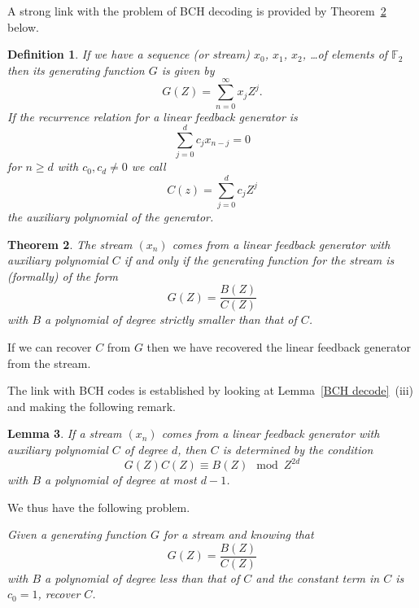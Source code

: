 \documentclass[12pt,a4paper]{article}
\theoremstyle{plain}
\newtheorem{theorem}{Theorem}[section]
\newtheorem{lemma}[theorem]{Lemma}
\newtheorem{definition}[theorem]{Definition}
\theoremstyle{definition}
\begin{document}
    A strong link with the problem of BCH decoding
    is provided by Theorem~\ref{quotient} below.
    \begin{definition}
        If we have a sequence (or stream) $x_{0}$, $x_{1}$,
        $x_{2}$, \dots of elements of ${\mathbb F}_{2}$ then
        its \emph{generating function} $G$ is given by
        \[G(Z)=\sum_{n=0}^{\infty}x_{j}Z^{j}.\]
        If the recurrence relation for
        a linear feedback generator is
        \[\sum_{j=0}^{d}c_{j}x_{n-j}=0\]
        for $n\geq d$ with $c_{0},c_{d}\neq 0$
        we call
        \[C(z)=\sum_{j=0}^{d}c_{j}Z^{j}\]
        the auxiliary polynomial of the generator.
    \end{definition}
    \begin{theorem}
        \label{quotient} The stream $(x_{n})$
        comes from a linear feedback generator with
        auxiliary polynomial $C$ if and only if
        the generating function for the stream is (formally)
        of the form
        \[G(Z)=\frac{B(Z)}{C(Z)}\]
        with $B$ a polynomial of degree strictly smaller than that
        of $C$.
    \end{theorem}
    \noindent
    If we can recover $C$ from $G$ then we have recovered
    the linear feedback generator from the stream.

    The link with BCH codes is established
    by looking at Lemma~\ref{BCH decode}~(iii) and
    making the following remark.
    \begin{lemma}
        \label{how long}
        If a stream $(x_{n})$
        comes from a linear feedback generator with
        auxiliary polynomial $C$ of degree $d$,
        then $C$ is determined by the condition
        \[G(Z)C(Z)\equiv B(Z)\mod{Z^{2d}}\]
        with $B$ a polynomial of degree at most $d-1$.
    \end{lemma}

    We thus have the following problem.

    \emph{Given a generating function $G$
    for a stream and knowing that
    \[G(Z)=\frac{B(Z)}{C(Z)}\]
    with $B$ a polynomial of degree less than that
    of $C$ and the constant term in $C$ is
    $c_{0}=1$, recover $C$.}

    \vspace{1\baselineskip}
\end{document}
